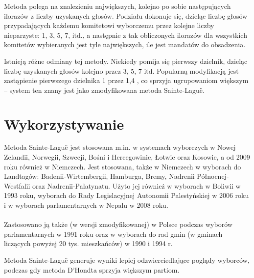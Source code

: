 \documentclass[12pt,a4paper,titlepage]{report}
\begin{document}
Metoda polega na znalezieniu największych, kolejno po sobie następujących ilorazów z liczby uzyskanych głosów. Podziału dokonuje się, dzieląc liczbę głosów przypadających każdemu komitetowi wyborczemu przez kolejne liczby nieparzyste: 1, 3, 5, 7, itd., a następnie z tak obliczonych ilorazów dla wszystkich komitetów wybieranych jest tyle największych, ile jest mandatów do obsadzenia.

Istnieją różne odmiany tej metody. Niekiedy pomija się pierwszy dzielnik, dzieląc liczbę uzyskanych głosów kolejno przez 3, 5, 7 itd. Popularną modyfikacją jest zastąpienie pierwszego dzielnika 1 przez 1,4 , co sprzyja ugrupowaniom większym – system ten znany jest jako zmodyfikowana metoda Sainte-Laguë.\cite{wiki:msl}
\section{Wykorzystywanie}

Metoda Sainte-Laguë jest stosowana m.in. w systemach wyborczych w Nowej Zelandii, Norwegii, Szwecji, Bośni i Hercegowinie, Łotwie oraz Kosowie, a od 2009 roku również w Niemczech. Jest stosowana, także w Niemczech w wyborach do Landtagów: Badenii-Wirtembergii, Hamburga, Bremy, Nadrenii Północnej-Westfalii oraz Nadrenii-Palatynatu. Użyto jej również w wyborach w Boliwii w 1993 roku, wyborach do Rady Legislacyjnej Autonomii Palestyńskiej w 2006 roku i w wyborach parlamentarnych w Nepalu w 2008 roku. \\ \\

Zastosowano ją także (w wersji zmodyfikowanej) w Polsce podczas wyborów parlamentarnych w 1991 roku oraz w wyborach do rad gmin (w gminach liczących powyżej 20 tys. mieszkańców) w 1990 i 1994 r.

Metoda Sainte-Laguë generuje wyniki lepiej odzwierciedlające poglądy wyborców, podczas gdy metoda D’Hondta sprzyja większym partiom.\cite{wiki:msl}
\end{document}
